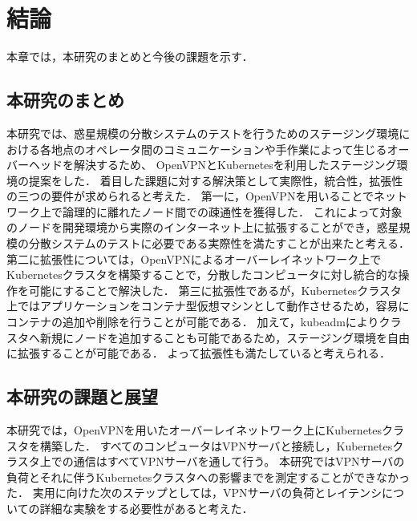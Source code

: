 \chapter{結論}
\label{conclusion}

本章では，本研究のまとめと今後の課題を示す．

\section{本研究のまとめ}
\label{conclusion:conclusion}

本研究では、惑星規模の分散システムのテストを行うためのステージング環境における各地点のオペレータ間のコミュニケーションや手作業によって生じるオーバーヘッドを解決するため、
OpenVPNとKubernetesを利用したステージング環境の提案をした．
着目した課題に対する解決策として実際性，統合性，拡張性の三つの要件が求められると考えた．
第一に，OpenVPNを用いることでネットワーク上で論理的に離れたノード間での疎通性を獲得した．
これによって対象のノードを開発環境から実際のインターネット上に拡張することができ，惑星規模の分散システムのテストに必要である実際性を満たすことが出来たと考える．
第二に拡張性については，OpenVPNによるオーバーレイネットワーク上でKubernetesクラスタを構築することで，分散したコンピュータに対し統合的な操作を可能にすることで解決した．
第三に拡張性であるが，Kubernetesクラスタ上ではアプリケーションをコンテナ型仮想マシンとして動作させるため，容易にコンテナの追加や削除を行うことが可能である．
加えて，kubeadmによりクラスタへ新規にノードを追加することも可能であるため，ステージング環境を自由に拡張することが可能である．
よって拡張性も満たしていると考えられる．

\section{本研究の課題と展望}
\label{conclusion:issue}

本研究では，OpenVPNを用いたオーバーレイネットワーク上にKubernetesクラスタを構築した．
すべてのコンピュータはVPNサーバと接続し，Kubernetesクラスタ上での通信はすべてVPNサーバを通して行う。
本研究ではVPNサーバの負荷とそれに伴うKubernetesクラスタへの影響までを測定することができなかった．
実用に向けた次のステップとしては，VPNサーバの負荷とレイテンシについての詳細な実験をする必要性があると考えた．

